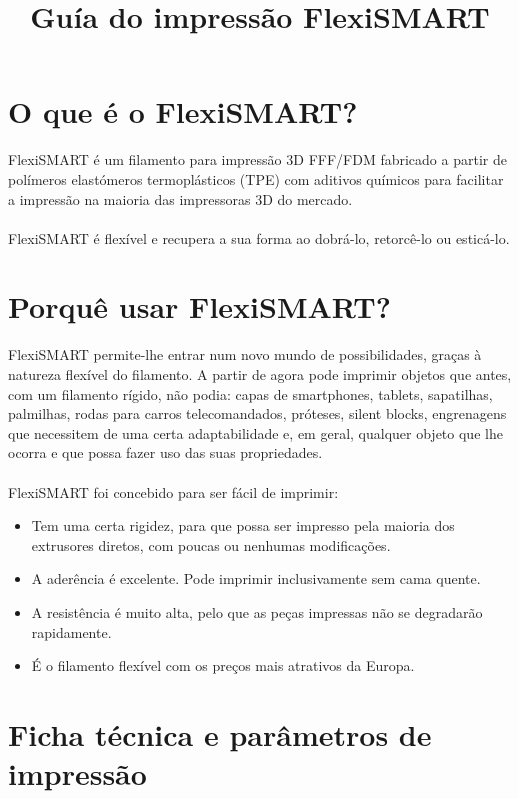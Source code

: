 \documentclass[11pt,a4paper]{article}
\title{Guía do impressão FlexiSMART}
\date{}
\begin{document}

\section{﻿O que é o FlexiSMART?}FlexiSMART é um filamento para impressão 3D FFF/FDM fabricado a partir de polímeros elastómeros termoplásticos (TPE) com aditivos químicos para facilitar a impressão na maioria das impressoras 3D do mercado.
\\\\
FlexiSMART é flexível e recupera a sua forma ao dobrá-lo, retorcê-lo ou esticá-lo.

\section{Porquê usar FlexiSMART?}
FlexiSMART permite-lhe entrar num novo mundo de possibilidades, graças à natureza flexível do filamento. A partir de agora pode imprimir objetos que antes, com um filamento rígido, não podia: capas de smartphones, tablets, sapatilhas, palmilhas, rodas para carros telecomandados, próteses, silent blocks, engrenagens que necessitem de uma certa adaptabilidade e, em geral, qualquer objeto que lhe ocorra e que possa fazer uso das suas propriedades.
\\\\
FlexiSMART foi concebido para ser fácil de imprimir:
\begin{itemize}
\item Tem uma certa rigidez, para que possa ser impresso pela maioria dos extrusores diretos, com poucas ou nenhumas modificações.
\item A aderência é excelente. Pode imprimir inclusivamente sem cama quente.
\item A resistência é muito alta, pelo que as peças impressas não se degradarão rapidamente.
\item É o filamento flexível com os preços mais atrativos da Europa.
\end{itemize}

\section{Ficha técnica e parâmetros de impressão}
\end{document}
